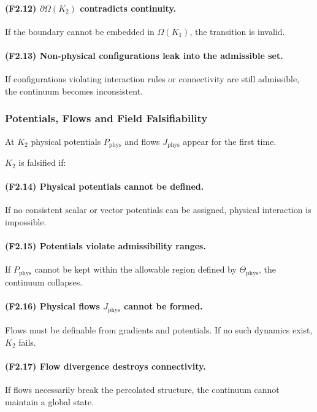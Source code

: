 \paragraph{(F2.12) \texorpdfstring{$\partial\Omega(K_2)$}{\partial\Omega(K_2)} contradicts continuity.}
If the boundary cannot be embedded in $\Omega(K_1)$, the transition is
invalid.

\paragraph{(F2.13) Non-physical configurations leak into the admissible
set.}
If configurations violating interaction rules or connectivity are still
admissible, the continuum becomes inconsistent.



\subsubsection{Potentials, Flows and Field Falsifiability}

At $K_2$ physical potentials $P_{\mathrm{phys}}$ and flows
$J_{\mathrm{phys}}$ appear for the first time.

$K_2$ is falsified if:

\paragraph{(F2.14) Physical potentials cannot be defined.}
If no consistent scalar or vector potentials can be assigned, physical
interaction is impossible.

\paragraph{(F2.15) Potentials violate admissibility ranges.}
If $P_{\mathrm{phys}}$ cannot be kept within the allowable region
defined by $\Theta_{\mathrm{phys}}$, the continuum collapses.

\paragraph{(F2.16) Physical flows $J_{\mathrm{phys}}$ cannot be formed.}
Flows must be definable from gradients and potentials.
If no such dynamics exist, $K_2$ fails.

\paragraph{(F2.17) Flow divergence destroys connectivity.}
If flows necessarily break the percolated structure, the continuum
cannot maintain a global state.



